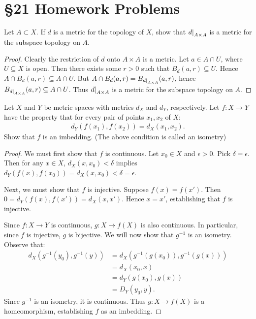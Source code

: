 \documentclass[12pt,twoside,openany]{memoir}
\begin{document}
\section*{\S 21 Homework Problems}
\begin{exercise}[manual-num={1}]
Let $A \subset X$. If $d$ is a metric for the topology of $X$, show that $\restr{d}{A \times A}$ is a metric for the subspace topology on $A$.
\end{exercise}
    {\color{blue} \begin{proof}
        Clearly the restriction of $d$ onto $A \times A$ is a metric. Let $a \in A \cap U$, where $U \subseteq X$ is open. Then there exists some $r > 0$ such that $B_d(a,r) \subseteq U$. Hence $A \cap B_d(a,r) \subseteq A \cap U$. But $A \cap B_d(a,r) = B_{\restr{d}{A \times A}}(a,r)$, hence $B_{\restr{d}{A \times A}}(a,r) \subseteq A \cap U$. Thus $\restr{d}{A \times A}$ is a metric for the subspace topology on $A$.
    \end{proof}}
\begin{exercise}[manual-num={2}]
Let $X$ and $Y$ be metric spaces with metrics $d_X$ and $d_Y$, respectively. Let $f:X \rightarrow Y$ have the property that for every pair of points $x_1,x_2$ of $X$:
    \begin{equation*}
    \begin{split}
        d_Y(f(x_1),f(x_2)) = d_X(x_1,x_2).
    \end{split}
    \end{equation*}
Show that $f$ is an imbedding. (The above condition is called an isometry)
\end{exercise}
    {\color{blue} \begin{proof}
        We must first show that $f$ is continuous. Let $x_0 \in X$ and $\epsilon > 0$. Pick $\delta = \epsilon$. Then for any $x \in X$, $d_X(x,x_0) < \delta$ implies $d_Y(f(x),f(x_0)) = d_X(x,x_0) < \delta = \epsilon$.

        Next, we must show that $f$ is injective. Suppose $f(x) = f(x')$. Then $0 = d_Y(f(x),f(x')) = d_X(x,x')$. Hence $x = x'$, establishing that $f$ is injective.

        Since $f:X \rightarrow Y$ is continuous, $g:X \rightarrow f(X)$ is also continuous. In particular, since $f$ is injective, $g$ is bijective. We will now show that $g^{-1}$ is an isometry. Observe that:
            \begin{equation*}
            \begin{split}
                d_X(g^{-1}(y_0),g^{-1}(y)) 
                & = d_X(g^{-1}(g(x_0)),g^{-1}(g(x))) \\
                & = d_X(x_0,x) \\
                & = d_Y(g(x_0),g(x)) \\
                & = D_Y(y_0,y).
            \end{split}
            \end{equation*}
        Since $g^{-1}$ is an isometry, it is continuous. Thus $g:X \rightarrow f(X)$ is a homeomorphism, establishing $f$ as an imbedding.
    \end{proof}}
\end{document}
